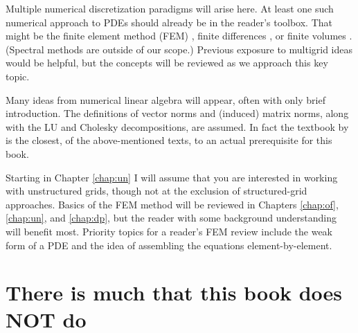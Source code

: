 Multiple numerical discretization paradigms will arise here.  At least one such numerical approach to PDEs should already be in the reader's toolbox.  That might be the finite element method (FEM) \citep{Braess2007,Elmanetal2005,KarniadakisSherwin2013}, finite differences \citep{MortonMayers2005}, or finite volumes \citep{LeVeque2002}.  (Spectral methods \citep{Trefethen2000} are outside of our scope.)  Previous exposure to multigrid ideas \citep{Briggsetal2000} would be helpful, but the concepts will be reviewed as we approach this key topic.

Many ideas from numerical linear algebra \citep{Greenbaum1997,TrefethenBau1997} will appear, often with only brief introduction.  The definitions of vector norms and (induced) matrix norms, along with the LU and Cholesky decompositions, are assumed.  In fact the textbook by \citet{TrefethenBau1997} is the closest, of the above-mentioned texts, to an actual prerequisite for this book.

Starting in Chapter \ref{chap:un} I will assume that you are interested in working with unstructured grids, though not at the exclusion of structured-grid approaches.  Basics of the FEM method will be reviewed in Chapters \ref{chap:of}, \ref{chap:un}, and \ref{chap:dp}, but the reader with some background understanding will benefit most.  Priority topics for a reader's FEM review include the weak form of a PDE and the idea of assembling the equations element-by-element.


\section{There is much that this book does NOT do}

